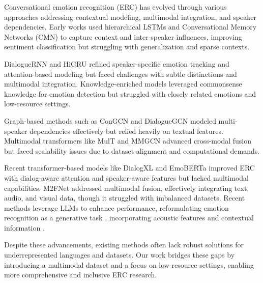 Conversational emotion recognition (ERC) has evolved through various approaches addressing contextual modeling, multimodal integration, and speaker dependencies. Early works used hierarchical LSTMs \cite{poria2017context} and Conversational Memory Networks (CMN) \cite{hazarika2018conversational} to capture context and inter-speaker influences, improving sentiment classification but struggling with generalization and sparse contexts.

DialogueRNN \cite{majumder2019attentive} and HiGRU \cite{jiao2019higru} refined speaker-specific emotion tracking and attention-based modeling but faced challenges with subtle distinctions and multimodal integration. Knowledge-enriched models \cite{zhong2019knowledge} leveraged commonsense knowledge for emotion detection but struggled with closely related emotions and low-resource settings.

Graph-based methods such as ConGCN \cite{zhang2019modeling} and DialogueGCN \cite{ghosal2019dialoguegcn} modeled multi-speaker dependencies effectively but relied heavily on textual features. Multimodal transformers like MulT \cite{tsai2019multimodal} and MMGCN \cite{hu2021mmgcn} advanced cross-modal fusion but faced scalability issues due to dataset alignment and computational demands.

Recent transformer-based models like DialogXL \cite{shen2021dialogxl} and EmoBERTa \cite{kim2021emoberta} improved ERC with dialog-aware attention and speaker-aware features but lacked multimodal capabilities. M2FNet \cite{chudasama2022m2fnet} addressed multimodal fusion, effectively integrating text, audio, and visual data, though it struggled with imbalanced datasets. Recent methods leverage LLMs to enhance performance, reformulating emotion recognition as a generative task \cite{lei2023instructerc}, incorporating acoustic features \cite{wu2024beyond} and contextual information \cite{xue2024bioserc, fu2024ckerc, zhang2023dialoguellm}.

Despite these advancements, existing methods often lack robust solutions for underrepresented languages and datasets. Our work bridges these gaps by introducing a multimodal dataset and a focus on low-resource settings, enabling more comprehensive and inclusive ERC research.